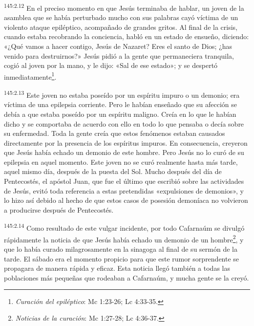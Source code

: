 \par
\textsuperscript{145:2.12} En el preciso momento en que Jesús terminaba de hablar, un joven de la asamblea que se había perturbado mucho con sus palabras cayó víctima de un violento ataque epiléptico, acompañado de grandes gritos. Al final de la crisis, cuando estaba recobrando la conciencia, habló en un estado de ensueño, diciendo: «¿Qué vamos a hacer contigo, Jesús de Nazaret? Eres el santo de Dios; ¿has venido para destruirnos?» Jesús pidió a la gente que permaneciera tranquila, cogió al joven por la mano, y le dijo: «Sal de ese estado»; y se despertó inmediatamente\footnote{\textit{Curación del epiléptico}: Mc 1:23-26; Lc 4:33-35.}.

\par
\textsuperscript{145:2.13} Este joven no estaba poseído por un espíritu impuro o un demonio; era víctima de una epilepsia corriente. Pero le habían enseñado que su afección se debía a que estaba poseído por un espíritu maligno. Creía en lo que le habían dicho y se comportaba de acuerdo con ello en todo lo que pensaba o decía sobre su enfermedad. Toda la gente creía que estos fenómenos estaban causados directamente por la presencia de los espíritus impuros. En consecuencia, creyeron que Jesús había echado un demonio de este hombre. Pero Jesús no lo curó de su epilepsia en aquel momento. Este joven no se curó realmente hasta más tarde, aquel mismo día, después de la puesta del Sol. Mucho después del día de Pentecostés, el apóstol Juan, que fue el último que escribió sobre las actividades de Jesús, evitó toda referencia a estas pretendidas «expulsiones de demonios», y lo hizo así debido al hecho de que estos casos de posesión demoníaca no volvieron a producirse después de Pentecostés.

\par
\textsuperscript{145:2.14} Como resultado de este vulgar incidente, por todo Cafarnaúm se divulgó rápidamente la noticia de que Jesús había echado un demonio de un hombre\footnote{\textit{Noticias de la curación}: Mc 1:27-28; Lc 4:36-37.}, y que lo había curado milagrosamente en la sinagoga al final de su sermón de la tarde. El sábado era el momento propicio para que este rumor sorprendente se propagara de manera rápida y eficaz. Esta noticia llegó también a todas las poblaciones más pequeñas que rodeaban a Cafarnaúm, y mucha gente se la creyó.

